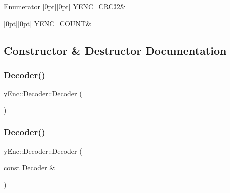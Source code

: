 \begin{DoxyEnumFields}{Enumerator}
[0pt][0pt]{}\hypertarget{classy_enc_1_1_decoder_a15a9416c693c4a3333d0b2417decdffea6e93d0d81ac7ba42876216ff81afac0f}{}\label{classy_enc_1_1_decoder_a15a9416c693c4a3333d0b2417decdffea6e93d0d81ac7ba42876216ff81afac0f} 
Y\+E\+N\+C\+\_\+\+C\+R\+C32&\\
\hline

[0pt][0pt]{}\hypertarget{classy_enc_1_1_decoder_a15a9416c693c4a3333d0b2417decdffeae4f10b60345053ec76d279f0b1a28dcf}{}\label{classy_enc_1_1_decoder_a15a9416c693c4a3333d0b2417decdffeae4f10b60345053ec76d279f0b1a28dcf} 
Y\+E\+N\+C\+\_\+\+C\+O\+U\+NT&\\
\hline

\end{DoxyEnumFields}


\subsection{Constructor \& Destructor Documentation}
\hypertarget{classy_enc_1_1_decoder_af806b51596a3984a3eb2b1c75403c95f}{}\label{classy_enc_1_1_decoder_af806b51596a3984a3eb2b1c75403c95f} 
\subsubsection{\texorpdfstring{Decoder()}{Decoder()}\hspace{0.1cm}{\footnotesize\ttfamily [1/3]}}
{\footnotesize\ttfamily y\+Enc\+::\+Decoder\+::\+Decoder (\begin{DoxyParamCaption}{ }\end{DoxyParamCaption})}

\hypertarget{classy_enc_1_1_decoder_a5dfd7073dfac210273691c058d503208}{}\label{classy_enc_1_1_decoder_a5dfd7073dfac210273691c058d503208} 
\subsubsection{\texorpdfstring{Decoder()}{Decoder()}\hspace{0.1cm}{\footnotesize\ttfamily [2/3]}}
{\footnotesize\ttfamily y\+Enc\+::\+Decoder\+::\+Decoder (\begin{DoxyParamCaption}\item[{const \hyperlink{classy_enc_1_1_decoder}{Decoder} \&}]{ }\end{DoxyParamCaption})\hspace{0.3cm}{\ttfamily [default]}}

